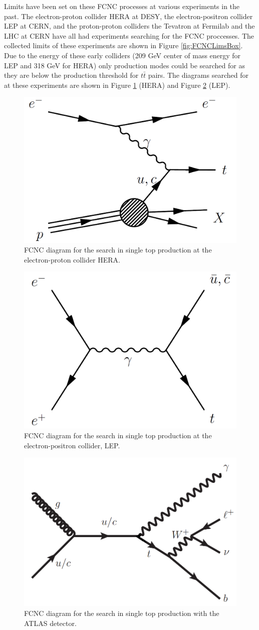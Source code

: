 Limits have been set on these FCNC processes at various experiments in the past.  The electron-proton collider HERA at DESY, the electron-positron collider LEP at CERN, and the proton-proton colliders the Tevatron at Fermilab and the LHC at CERN have all had experiments searching for the FCNC proccesses.  The collected limits of these experiments are shown in Figure \ref{fig:FCNCLimsBox}.  Due to the energy of these early colliders (209 GeV center of mass energy for LEP and 318 GeV for HERA) only production modes could be searched for as they are below the production threshold for $t\bar{t}$ pairs. The diagrams searched for at these experiments are shown in Figure \ref{fig:fcncHera} (HERA) and Figure \ref{fig:fcncLep} (LEP).
\begin{figure}[h!]
	\centering
	\includegraphics[width=.4\columnwidth]{../ThesisImages/Theory/HeraFCNC.png}
	\caption{FCNC diagram for the search in single top production at the electron-proton collider HERA.}
	\label{fig:fcncHera}
\end{figure}
\begin{figure}[h!]
	\centering
	\includegraphics[width=.4\columnwidth]{../ThesisImages/Theory/LepFCNC.png}
	\caption{FCNC diagram for the search in single top production at the electron-positron collider, LEP.}
	\label{fig:fcncLep}
\end{figure}

\begin{figure}[h!]
	\centering
	\includegraphics[width=.4\columnwidth]{../ThesisImages/Theory/ProductionMode.png}
	\caption[FCNC diagram for the search in single top production with the ATLAS detector.]{FCNC diagram for the search in single top production with the ATLAS detector\cite{GregorFCNC}. }
	\label{fig:ProductionMode}
\end{figure}

